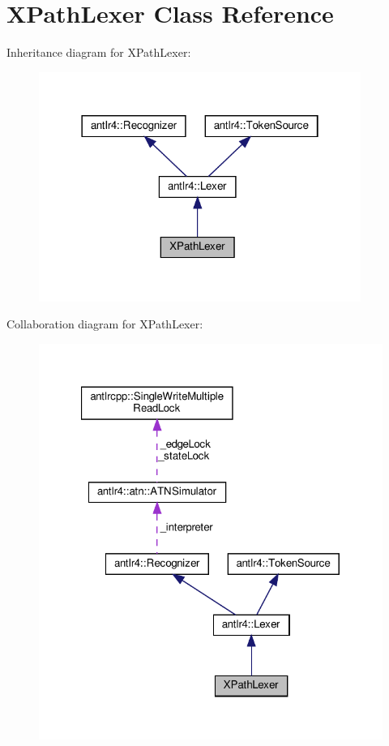 \hypertarget{classXPathLexer}{}\section{X\+Path\+Lexer Class Reference}
\label{classXPathLexer}


Inheritance diagram for X\+Path\+Lexer\+:
\nopagebreak
\begin{figure}[H]
\begin{center}
\leavevmode
\includegraphics[width=298pt]{classXPathLexer__inherit__graph}
\end{center}
\end{figure}


Collaboration diagram for X\+Path\+Lexer\+:
\nopagebreak
\begin{figure}[H]
\begin{center}
\leavevmode
\includegraphics[width=321pt]{classXPathLexer__coll__graph}
\end{center}
\end{figure}
